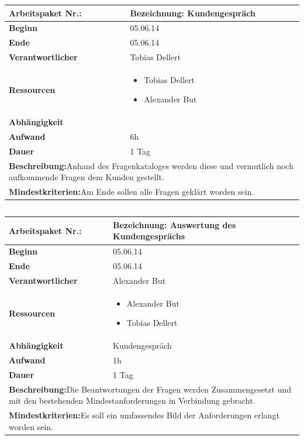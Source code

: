 \documentclass[fontsize=12pt,paper=a4,twoside]{scrartcl}
\begin{document}
	\begin{tabular}{|p{5.3cm}|p{9.7cm}|}\hline
		\textbf{Arbeitspaket Nr.:}  & \textbf{Bezeichnung:} Kundengespräch\\ \hline \hline
		\textbf{Beginn} & 05.06.14\\ \hline
		\textbf{Ende} & 05.06.14\\ \hline
		\textbf{Verantwortlicher} & Tobias Dellert\\ \hline
		\textbf{Ressourcen} & \begin{itemize}
			\item Tobias Dellert
			\item Alexander But
		\end{itemize}    \\ \hline
		\textbf{Abhängigkeit} &\\ \hline
		\textbf{Aufwand} & 6h\\ \hline
		\textbf{Dauer} & 1 Tag\\ \hline
		\multicolumn{2}{|p{15cm}|}{\textbf{Beschreibung:}\newline Anhand des Fragenkataloges werden diese und vermutlich noch aufkommende Fragen dem Kunden gestellt. }\\ \hline
		\multicolumn{2}{|p{15cm}|}{\textbf{Mindestkriterien:}\newline Am Ende sollen alle Fragen geklärt worden sein. }\\ \hline
	\end{tabular}
	
	\begin{verbatim} 
	\end{verbatim}
	
	\begin{tabular}{|p{5.3cm}|p{9.7cm}|}\hline
		\textbf{Arbeitspaket Nr.:}  & \textbf{Bezeichnung:} Auswertung des Kundengesprächs\\ \hline \hline
		\textbf{Beginn} & 05.06.14\\ \hline
		\textbf{Ende} & 05.06.14\\ \hline
		\textbf{Verantwortlicher} & Alexander But\\ \hline
		\textbf{Ressourcen} & \begin{itemize}
			\item Alexander But
			\item Tobias Dellert
		\end{itemize}    \\ \hline
		\textbf{Abhängigkeit} & Kundengespräch\\ \hline
		\textbf{Aufwand} & 1h\\ \hline
		\textbf{Dauer} & 1 Tag\\ \hline
		\multicolumn{2}{|p{15cm}|}{\textbf{Beschreibung:}\newline Die Beantwortungen der Fragen werden Zusammengesetzt und mit den bestehenden Mindestanforderungen in Verbindung gebracht. }\\ \hline
		\multicolumn{2}{|p{15cm}|}{\textbf{Mindestkriterien:}\newline Es soll ein umfassendes Bild der Anforderungen erlangt worden sein. }\\ \hline
	\end{tabular}
	
\end{document}
